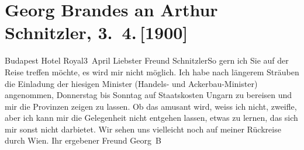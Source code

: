 

               \section[Georg Brandes an Arthur Schnitzler, 3. 4. {[}1900{]}]{ Georg Brandes an Arthur Schnitzler, 3. 4. {[}1900{]}}\nopagebreak{}\rehead{ }\begin{ledgroupsized}[t]{13cm}\normalsize\beginnumbering{} \toendnotes[C]{\smallbreak\pagebreak[2]} 
\toendnotes[C]{\smallbreak}\pstart
           \raggedleft{}{\pb}Budapest Hotel Royal3 April\pend
           \pstart
           Liebster Freund Schnitzler\hspace*{2.5em}So gern ich Sie auf der Reise treffen möchte,
                    es wird mir nicht möglich. Ich habe nach längerem Sträuben die Einladung der
                    hiesigen Minister (Handels- und Ackerbau-Minister) angenommen, Donnerstag bis Sonntag auf Staatskosten
                        Ungarn zu bereisen und mir die
                    Provinzen zeigen zu lassen. Ob das amusant wird, weiss ich nicht, zweifle, aber
                    ich kann mir die Gelegenheit nicht entgehen 
                    lassen, etwas zu lernen, das sich mir sonst nicht darbietet.\pend
           \pstart
           Wir sehen uns vielleicht noch auf meiner Rückreise durch Wien.\pend
           \pstart Ihr ergebener Freund \spacefill\mbox{Georg B}\pend{}          \endnumbering{}\end{ledgroupsized}  \newcommand{\dateiname}{L01029}\newcommand{\titel}{Georg Brandes an Arthur Schnitzler, 3. 4. [1900]}\newcommand{\editorInnen}{Martin Anton Müller und Gerd-Hermann Susen}
      